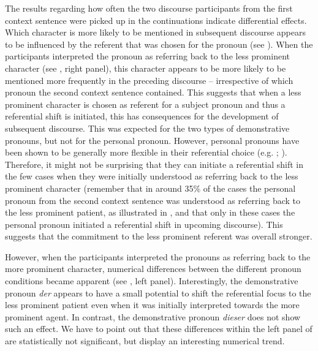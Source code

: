\documentclass[output=paper,colorlinks,citecolor=brown]{langscibook}
\begin{document}
The results regarding how often the two discourse participants from the first context sentence were picked up in the continuations indicate differential effects. Which character is more likely to be mentioned in subsequent discourse appears to be influenced by the referent that was chosen for the pronoun (see ). When the participants interpreted the pronoun as referring back to the less prominent character (see , right panel), this character appears to be more likely to be mentioned more frequently in the preceding discourse – irrespective of which pronoun the second context sentence contained. This suggests that when a less prominent character is chosen as referent for a subject pronoun and thus a referential shift is initiated, this has consequences for the development of subsequent discourse. This was expected for the two types of demonstrative pronouns, but not for the personal pronoun. However, personal pronouns have been shown to be generally more flexible in their referential choice (e.g. \citealt{BoschEtAl2007}; \citealt{SchumacherEtAl2016}). Therefore, it might not be surprising that they can initiate a referential shift in the few cases when they were initially understood as referring back to the less prominent character (remember that in around 35\% of the cases the personal pronoun from the second context sentence was understood as referring back to the less prominent patient, as illustrated in , and that only in these cases the personal pronoun initiated a referential shift in upcoming discourse). This suggests that the commitment to the less prominent referent was overall stronger.

However, when the participants interpreted the pronouns as referring back to the more prominent character, numerical differences between the different pronoun conditions became apparent (see , left panel). Interestingly, the demonstrative pronoun \textit{der} appears to have a small potential to shift the referential focus to the less prominent patient even when it was initially interpreted towards the more prominent agent. In contrast, the demonstrative pronoun \textit{dieser} does not show such an effect. We have to point out that these differences within the left panel of  are statistically not significant, but display an interesting numerical trend. 
\end{document}
